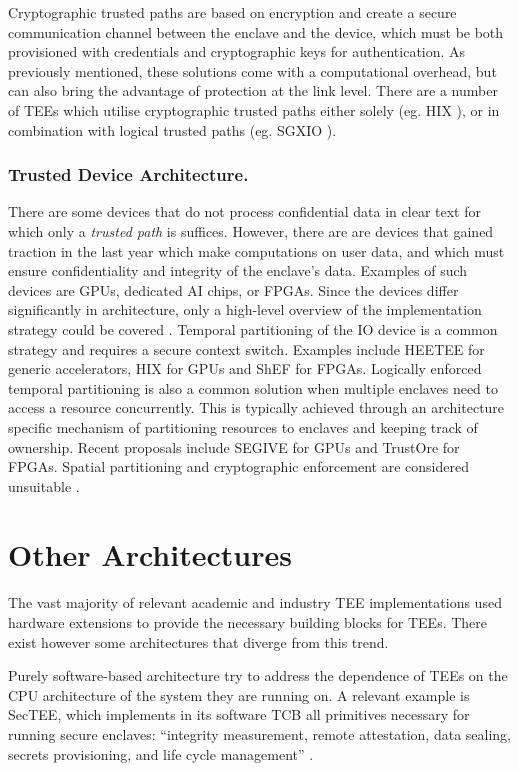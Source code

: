 \documentclass[runningheads,a4paper]{uwsese}
\begin{document}
Cryptographic trusted paths are based on encryption and create a secure
communication channel between the enclave and the device, which must be both
provisioned with credentials and cryptographic keys for authentication. As
previously mentioned, these solutions come with a computational overhead, but can also
bring the advantage of protection at the link level. There are a number of TEEs
which utilise cryptographic trusted paths either solely (eg. HIX
\cite{tee_hix}), or in combination with logical trusted paths (eg. SGXIO
\cite{tee_sgxio}).   

\subsubsection{Trusted Device Architecture.}

There are some devices that do not process confidential data in clear text for
which only a \emph{trusted path} is suffices. However, there are are devices
that gained traction in the last year which make computations on user data, and
which must ensure confidentiality and integrity of the enclave's data. Examples
of such devices are GPUs, dedicated AI chips, or FPGAs. Since the devices
differ significantly in architecture, only a high-level overview of the
implementation strategy could be covered \cite{tee_hw_sup}. Temporal
partitioning of the IO device is a common strategy and requires a secure
context switch. Examples include HEETEE \cite{tee_heetee} for generic
accelerators, HIX \cite{tee_hix} for GPUs and ShEF \cite{tee_shef} for FPGAs.
Logically enforced temporal partitioning is also a common solution when
multiple enclaves need to access a resource concurrently. This is typically
achieved through an architecture specific mechanism of partitioning resources
to enclaves and keeping track of ownership. Recent proposals include SEGIVE
\cite{tee_segive} for GPUs and TrustOre \cite{tee_trustore} for FPGAs. Spatial
partitioning and cryptographic enforcement are considered unsuitable
\cite{tee_hw_sup}.

\section{Other Architectures}

The vast majority of relevant academic and industry TEE implementations used
hardware extensions to provide the necessary building blocks for TEEs. There
exist however some architectures that diverge from this trend.

Purely software-based architecture try to address the dependence of TEEs on the
CPU architecture of the system they are running on. A relevant example is
SecTEE, which implements in its software TCB all primitives necessary for
running secure enclaves: ``integrity measurement, remote attestation, data
sealing, secrets provisioning, and life cycle management'' \cite{sec_tee}.
\end{document}
